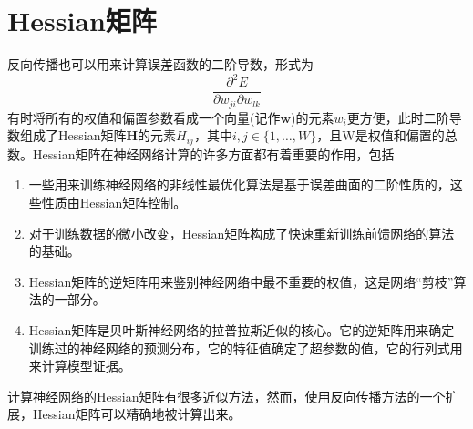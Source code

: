 \section{Hessian矩阵}
反向传播也可以用来计算误差函数的二阶导数，形式为
\begin{equation}
	\frac{\partial^2 E}{\partial w_{ji}\partial w_{lk}}
\end{equation}
有时将所有的权值和偏置参数看成一个向量(记作$\boldsymbol{w}$)的元素$w_i$更方便，此时二阶导数组成了Hessian矩阵$\boldsymbol{H}$的元素$H_{ij}$，其中$i,j\in \{1,\dots,W\}$，且W是权值和偏置的总数。Hessian矩阵在神经网络计算的许多方面都有着重要的作用，包括
\begin{enumerate}
	\item 一些用来训练神经网络的非线性最优化算法是基于误差曲面的二阶性质的，这些性质由Hessian矩阵控制。
	\item 对于训练数据的微小改变，Hessian矩阵构成了快速重新训练前馈网络的算法的基础。
	\item Hessian矩阵的逆矩阵用来鉴别神经网络中最不重要的权值，这是网络“剪枝”算法的一部分。
	\item Hessian矩阵是贝叶斯神经网络的拉普拉斯近似的核心。它的逆矩阵用来确定训练过的神经网络的预测分布，它的特征值确定了超参数的值，它的行列式用来计算模型证据。
\end{enumerate}

计算神经网络的Hessian矩阵有很多近似方法，然而，使用反向传播方法的一个扩展，Hessian矩阵可以精确地被计算出来。

